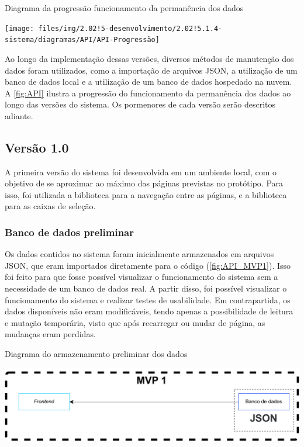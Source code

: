 \begin{MyCenteredFigure} \caption{Diagrama da progressão funcionamento da permanência dos dados} \label{fig:API}
  \texttt{[image: files/img/2.02!5-desenvolvimento/2.02!5.1.4-sistema/diagramas/API/API-Progressão]}
\end{MyCenteredFigure}

Ao longo da implementação dessas versões, diversos métodos de manutenção dos dados foram utilizados, como a importação de arquivos JSON, a utilização de um banco de dados local e a utilização de um banco de dados hospedado na nuvem. A \autoref{fig:API} ilustra a progressão do funcionamento da permanência dos dados ao longo das versões do sistema. Os pormenores de cada versão serão descritos adiante.

\subsection{Versão 1.0} \label{subsec:MVP1} %

A primeira versão do sistema foi desenvolvida em um ambiente local, com o objetivo de se aproximar ao máximo das páginas previstas no protótipo. Para isso, foi utilizada a biblioteca  para a navegação entre as páginas, e a biblioteca  para as caixas de seleção.

\subsubsection*{Banco de dados preliminar} \label{sssec:BDInicial}

Os dados contidos no sistema foram inicialmente armazenados em arquivos JSON, que eram importados diretamente para o código (\autoref{fig:API_MVP1}). Isso foi feito para que fosse possível visualizar o funcionamento do sistema sem a necessidade de um banco de dados real. A partir disso, foi possível visualizar o funcionamento do sistema e realizar testes de usabilidade. Em contrapartida, os dados disponíveis não eram modificáveis, tendo apenas a possibilidade de leitura e mutação temporária, visto que após recarregar ou mudar de página, as mudanças eram perdidas.

\begin{MyCenteredFigure} \caption{Diagrama do armazenamento preliminar dos dados} \label{fig:API_MVP1}
  \includegraphics[width=\textwidth]{files/img/2.02!5-desenvolvimento/2.02!5.1.4-sistema/diagramas/API/API_MVP1}
\end{MyCenteredFigure}

